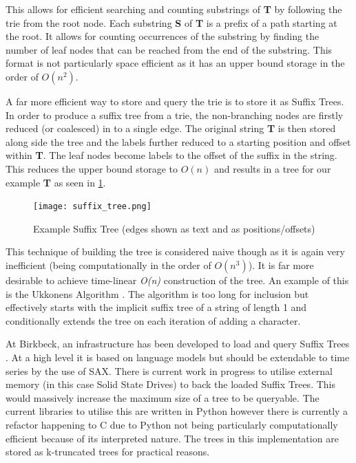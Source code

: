 \documentclass[11pt, a4paper]{scrartcl}
\begin{document}
	This allows for efficient searching and counting substrings of \textbf{T} by following the trie from the root node.  Each substring \textbf{S} of \textbf{T} is a prefix of a path starting at the root.  It allows for counting occurrences of the substring by finding the number of leaf nodes that can be reached from the end of the substring.  This format is not particularly space efficient as it has an upper bound storage in the order of \textit{$O(n^{2})$}.
	
	A far more efficient way to store and query the trie is to store it as Suffix Trees.  In order to produce a suffix tree from a trie, the non-branching nodes are firstly reduced (or coalesced) in to a single edge.  The original string \textbf{T} is then stored along side the tree and the labels further reduced to a starting position and offset within \textbf{T}.  The leaf nodes become labels to the offset of the suffix in the string.  This reduces the upper bound storage to \textit{$O(n)$} and results in a tree for our example \textbf{T} as seen in \cref{fig:tree}.
	\begin{figure}[h]
		\label{fig:tree}
		\centering
		\texttt{[image: suffix\_tree.png]}
		\caption{Example Suffix Tree (edges shown as text and as positions/offsets)}
	\end{figure}
	
	This technique of building the tree is considered naive though as it is again very inefficient (being computationally in the order of \textit{$O(n^{3})$}).  It is far more desirable to achieve time-linear \textit{O(n)} construction of the tree.  An example of this is the Ukkonens Algorithm \citep{ukkonens}.  The algorithm is too long for inclusion but effectively starts with the implicit suffix tree of a string of length 1 and conditionally extends the tree on each iteration of adding a character.
	
	At Birkbeck, an infrastructure has been developed to load and query Suffix Trees \citep{bbk-suffix}.  At a high level it is based on language models but should be extendable to time series by the use of SAX.  There is current work in progress to utilise external memory (in this case Solid State Drives) to back the loaded Suffix Trees.  This would massively increase the maximum size of a tree to be queryable.  The current libraries to utilise this are written in Python however there is currently a refactor happening to C due to Python not being particularly computationally efficient because of its interpreted nature.  The trees in this implementation are stored as k-truncated trees for practical reasons.
\end{document}
